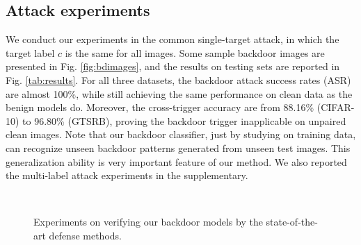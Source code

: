 \documentclass{article}
\begin{document}
\subsection{Attack experiments}
We conduct our experiments in the common single-target attack, in which the target label $c$ is the same for all images. Some sample backdoor images are presented in Fig. \ref{fig:bdimages}, and the results on testing sets are reported in Fig. \ref{tab:results}. For all three datasets, the backdoor attack success rates (ASR) are almost 100\%, while still achieving the same performance on clean data as the benign models do. Moreover, the cross-trigger accuracy are from 88.16\% (CIFAR-10) to 96.80\% (GTSRB), proving the backdoor trigger inapplicable on unpaired clean images. Note that our backdoor classifier, just by studying on training data, can recognize unseen backdoor patterns generated from unseen test images. This generalization ability is very important feature of our method. We also reported the multi-label attack experiments in the supplementary.

\begin{figure}[t]
\centering
{}
\hspace{2mm}
\\
\vskip 0.05in

    \vspace{-1.5mm}
\caption{Experiments on verifying our backdoor models by the state-of-the-art defense methods.}
\label{fig:defense}
\end{figure}
\end{document}
